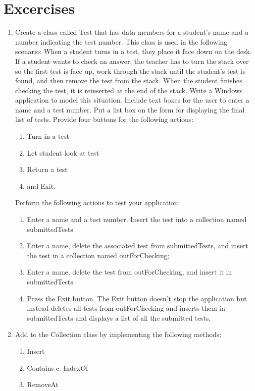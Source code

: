 \documentclass[12pt,a4paper,final,twoside,titlepage]{book}
\begin{document}
\section{Excercises}
\begin{enumerate}
\item Create a class called Test that has data members for a student’s name and a number indicating the test number. This class is used in the following scenario: When a student turns in a test, they place it face down on the desk. If a student wants to check an answer, the teacher has to turn the stack over so the first test is face up, work through the stack until the student’s test is found, and then remove the test from the stack. When the student finishes checking the test, it is reinserted at the end of the stack.
Write a Windows application to model this situation. Include text boxes for the user to enter a name and a test number. Put a list box on the form for displaying the final list of tests. Provide four buttons for the following actions: 
\begin{enumerate}
\item Turn in a test
\item Let student look at test
\item Return a test
\item and Exit.
\end{enumerate}
Perform the following actions to test your application: 
\begin{enumerate}
\item Enter a name and a test number. Insert the test into a collection named submittedTests
\item Enter a name, delete the associated test from submittedTests, and insert the test in a collection named outForChecking; \item Enter a name, delete the test from outForChecking, and insert it in submittedTests 
\item Press the Exit button. The Exit button doesn’t stop the application but instead deletes all tests from outForChecking and inserts them in submittedTests and displays a list of all the submitted tests.
\end{enumerate}
\item Add to the Collection class by implementing the following methods: 
\begin{enumerate}
\item Insert
\item Contains c. IndexOf
\item RemoveAt
\end{enumerate}
\end{enumerate}
\end{document}
